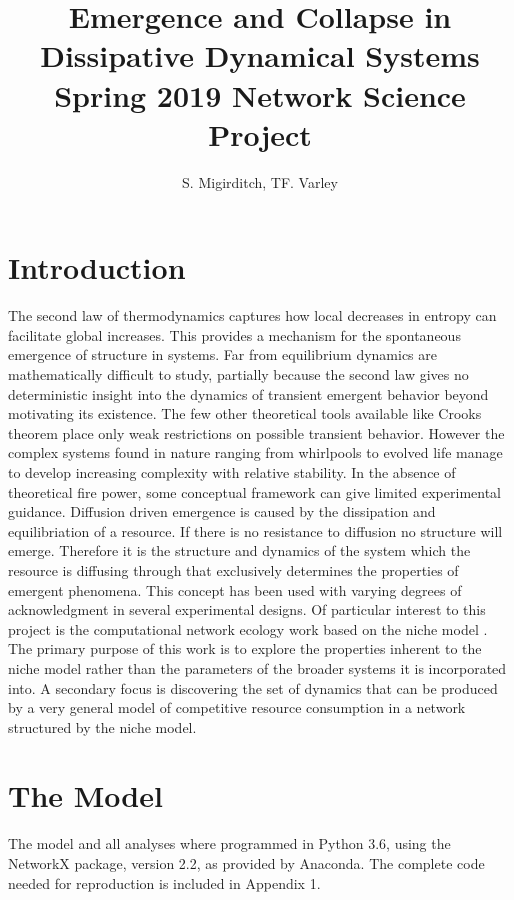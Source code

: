 \documentclass{paper}
\title{Emergence and Collapse in Dissipative Dynamical Systems \\ \textnormal{Spring 2019 Network Science Project}}
\author{S. Migirditch, TF. Varley}
\begin{document}
	\maketitle
	
	\section{Introduction}
	The second law of thermodynamics captures how local decreases in entropy can facilitate global increases. This provides a mechanism for the spontaneous emergence of structure in systems. Far from equilibrium dynamics are mathematically difficult to study, partially because the second law gives no deterministic insight into the dynamics of transient emergent behavior beyond motivating its existence. The few other theoretical tools available like Crooks theorem \cite{crooks_entropy_1999} place only weak restrictions on possible transient behavior.
	However the complex systems found in nature ranging from whirlpools to evolved life manage to develop increasing complexity with relative stability. In the absence of theoretical fire power, some conceptual framework can give limited experimental guidance. Diffusion driven emergence is caused by the dissipation and equilibriation of a resource. If there is no resistance to diffusion no structure will emerge. Therefore it is the structure and dynamics of the system which the resource is diffusing through that exclusively determines the properties of emergent phenomena\cite{strogatz_exploring_2001, gates_control_2016}. This concept has been used with varying degrees of acknowledgment in several experimental designs. Of particular interest to this project is the computational network ecology work based on the niche model \cite{Williams2000}. The primary purpose of this work is to explore the properties inherent to the niche model rather than the parameters of the broader systems it is incorporated into. A secondary focus is discovering the set of dynamics that can be produced by a very general model of competitive resource consumption in a network structured by the niche model. 
	\section{The Model}
	
	The model and all analyses where programmed in Python 3.6, using the NetworkX package, version 2.2, as provided by Anaconda. The complete code needed for reproduction is included in Appendix 1.
	
\end{document}
